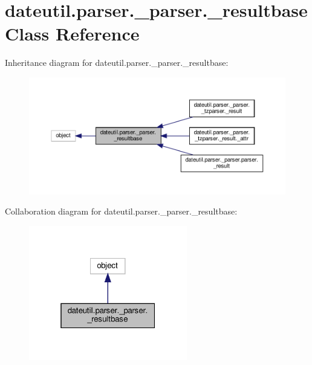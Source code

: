 \hypertarget{classdateutil_1_1parser_1_1__parser_1_1__resultbase}{}\section{dateutil.\+parser.\+\_\+parser.\+\_\+resultbase Class Reference}
\label{classdateutil_1_1parser_1_1__parser_1_1__resultbase}


Inheritance diagram for dateutil.\+parser.\+\_\+parser.\+\_\+resultbase\+:
\nopagebreak
\begin{figure}[H]
\begin{center}
\leavevmode
\includegraphics[width=350pt]{classdateutil_1_1parser_1_1__parser_1_1__resultbase__inherit__graph}
\end{center}
\end{figure}


Collaboration diagram for dateutil.\+parser.\+\_\+parser.\+\_\+resultbase\+:
\nopagebreak
\begin{figure}[H]
\begin{center}
\leavevmode
\includegraphics[width=196pt]{classdateutil_1_1parser_1_1__parser_1_1__resultbase__coll__graph}
\end{center}
\end{figure}

